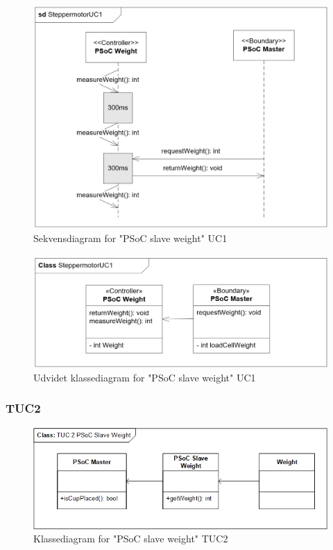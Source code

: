 \begin{figure}[H]
	\centering
	\includegraphics[width=1\textwidth]{Images/Applikationsmodeller/PSoCWeight/sdAppWeightUC1.png}
	\caption{Sekvensdiagram for "PSoC slave weight" UC1}
	\label{fig:sdAppWeightUC1}
\end{figure}

\begin{figure}[H]
	\centering
	\includegraphics[width=1\textwidth]{Images/Applikationsmodeller/PSoCWeight/ClassExtAppWeightUC1.png}
	\caption{Udvidet klassediagram for "PSoC slave weight" UC1}
	\label{fig:ClassExtAppWeightUC1}
\end{figure}

\subsubsection{TUC2}
\begin{figure}[H]
	\centering
	\includegraphics[width=1\textwidth]{Images/Applikationsmodeller/PSoCWeight/Class_TUC2_PSoC_Slave_Weight.png}
	\caption{Klassediagram for "PSoC slave weight" TUC2}
	\label{fig:cdTUC2PSoCSlaveWeight}
\end{figure}

